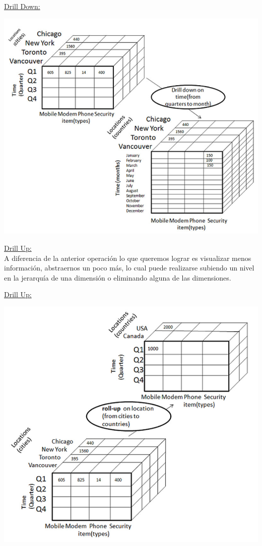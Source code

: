 \documentclass{fancyslides}
\begin{document}
\begin{frame}
\misc
{
  \underline{Drill Down:}
  \begin{center}
  \includegraphics[scale=0.5]{drill_down}
  \end{center}
}
\end{frame}


\begin{frame}
\misc
{
  \underline{Drill Up:}\\
A diferencia de la anterior operación lo que queremos lograr es visualizar menos información, abstraernos un poco más, lo cual puede realizarse subiendo un nivel en la jerarquía de una dimensión o eliminando alguna de las dimensiones.

}
\end{frame}

\begin{frame}
\misc
{
  \underline{Drill Up:}
  \begin{center}
  \includegraphics[scale=0.2]{drill_up}
  \end{center}
}
\end{frame}
\end{document}
